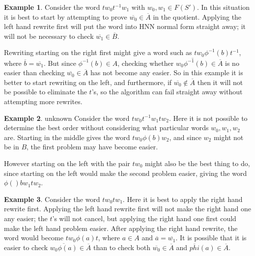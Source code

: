 \documentclass[11pt]{article} %
\theoremstyle{definition}
\theoremstyle{definition}
\theoremstyle{definition}
\theoremstyle{definition}
\theoremstyle{definition}
\theoremstyle{definition}
\newtheorem{exmpl}{Example}[theorem]
\begin{document}
\begin{exmpl}\label{rtlbad}
Consider the word $tw_0t^{-1}w_1$ with $w_0, w_1 \in F(S')$. In this situation
it is best to start by attempting to prove $\overline{w_0} \in \overline{A}$ in the quotient.
Applying the left hand rewrite first will put the word into HNN normal form
straight away; it will not be necessary to check $\overline{w_1} \in \overline{B}$.

Rewriting starting on the right first might give a word such as
$tw_0 \phi^{-1}(b)t^{-1}$, where $\overline{b} = \overline{w_1}$. But since
$\phi^{-1}(b) \in A$, checking whether $\overline{w_0\phi^{-1}(b)} \in \overline{A}$ is
no easier than checking $\overline{w_0} \in \overline{A}$ has not become
any easier. So in this example it is better to start rewriting on the left, and furthermore,
if $\overline{w_0} \notin \overline{A}$ then it will not be possible to eliminate the $t$'s, so the
algorithm can fail straight away without attempting more rewrites.



\end{exmpl}

\begin{exmpl}{unknown}
  Consider the word $tw_0t^{-1}w_1tw_2$. Here it is not possible to determine the best order without
  considering what particular words $w_0, w_1, w_2$ are. Starting in the middle gives the word
  $tw_0\phi(b)w_2$, and since $w_2$ might not be in $B$, the first problem may have become easier.

  However starting on the left with the pair $tw_0$
  might also be the best thing to do, since starting on the left would
  make the second problem easier, giving the word $\phi()bw_1 t w_2$.
\end{exmpl}

\begin{exmpl}\label{ltrbad2}
  Consider the word $tw_0tw_1$. Here it is best to apply the right hand rewrite first.
  Applying the left hand rewrite first will not make the right hand one any easier; the $t$'s will
  not cancel, but applying the right hand one first could make the left hand problem easier.
  After applying the right hand rewrite, the word would become $tw_0\phi(a)t$, where $a \in A$
  and $\overline{a} = \overline{w_1}$. It is possible that it is easier to check $\overline{w_0\phi(a)} \in \overline{A}$
  than to check both $\overline{w_0} \in \overline{A}$ and $\overline{phi}(a) \in \overline{A}$.
\end{exmpl}
\end{document}
